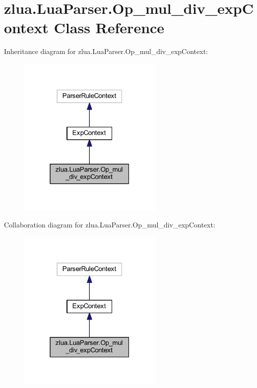 \hypertarget{classzlua_1_1_lua_parser_1_1_op__mul__div__exp_context}{}\section{zlua.\+Lua\+Parser.\+Op\+\_\+mul\+\_\+div\+\_\+exp\+Context Class Reference}
\label{classzlua_1_1_lua_parser_1_1_op__mul__div__exp_context}


Inheritance diagram for zlua.\+Lua\+Parser.\+Op\+\_\+mul\+\_\+div\+\_\+exp\+Context\+:
\nopagebreak
\begin{figure}[H]
\begin{center}
\leavevmode
\includegraphics[width=199pt]{classzlua_1_1_lua_parser_1_1_op__mul__div__exp_context__inherit__graph}
\end{center}
\end{figure}


Collaboration diagram for zlua.\+Lua\+Parser.\+Op\+\_\+mul\+\_\+div\+\_\+exp\+Context\+:
\nopagebreak
\begin{figure}[H]
\begin{center}
\leavevmode
\includegraphics[width=199pt]{classzlua_1_1_lua_parser_1_1_op__mul__div__exp_context__coll__graph}
\end{center}
\end{figure}
